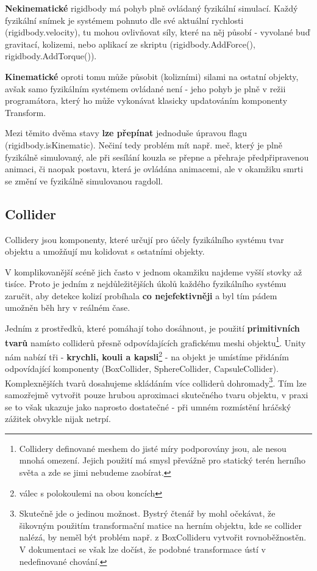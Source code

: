 \textbf{Nekinematické} rigidbody má pohyb plně ovládaný fyzikální simulací. Každý fyzikální snímek je systémem pohnuto dle své aktuální rychlosti (rigidbody.velocity), tu mohou ovlivňovat síly, které na něj působí - vyvolané buď gravitací, kolizemi, nebo aplikací ze skriptu (rigidbody.AddForce(), rigidbody.AddTorque()).

\textbf{Kinematické} oproti tomu může působit (kolizními) silami na ostatní objekty, avšak samo fyzikálním systémem ovládané není - jeho pohyb je plně v režii programátora, který ho může vykonávat klasicky updatováním komponenty Transform.

Mezi těmito dvěma stavy \textbf{lze přepínat} jednoduše úpravou flagu (rigidbody.isKinematic). Nečiní tedy problém mít např. meč, který je plně fyzikálně simulovaný, ale při sesílání kouzla se přepne a přehraje předpřipravenou animaci, či naopak postavu, která je ovládána animacemi, ale v okamžiku smrti se změní ve fyzikálně simulovanou ragdoll.

\subsection{Collider} \label{collidersPhysicsIntroSubsection}

Collidery jsou komponenty, které určují pro účely fyzikálního systému tvar objektu a umožňují mu kolidovat s ostatními objekty. 

V komplikovanější scéně jich často v jednom okamžiku najdeme vyšší stovky až tisíce. Proto je jedním z nejdůležitějších úkolů každého fyzikálního systému zaručit, aby detekce kolizí probíhala \textbf{co nejefektivněji} a byl tím pádem umožněn běh hry v reálném čase.

Jedním z prostředků, které pomáhají toho dosáhnout, je použití \textbf{primitivních tvarů} namísto colliderů přesně odpovídajících grafickému meshi objektu\footnote{Collidery definované meshem do jisté míry podporovány jsou, ale nesou mnohá omezení. Jejich použití má smysl převážně pro statický terén herního světa a zde se jimi nebudeme zaobírat.}. Unity nám nabízí tři - \textbf{krychli, kouli a kapsli}\footnote{válec s polokoulemi na obou koncích} - na objekt je umístíme přidáním odpovídající komponenty (BoxCollider, SphereCollider, CapsuleCollider). Komplexnějších tvarů dosahujeme skládáním více colliderů dohromady\footnote{Skutečně jde o jedinou možnost. Bystrý čtenář by mohl očekávat, že šikovným použitím transformační matice na herním objektu, kde se collider nalézá, by neměl být problém např. z BoxCollideru vytvořit rovnoběžnostěn. V dokumentaci se však lze dočíst, že podobné transformace ústí v nedefinované chování.}. Tím lze samozřejmě vytvořit pouze hrubou aproximaci skutečného tvaru objektu, v praxi se to však ukazuje jako naprosto dostatečné - při umném rozmístění hráčský zážitek obvykle nijak netrpí.

